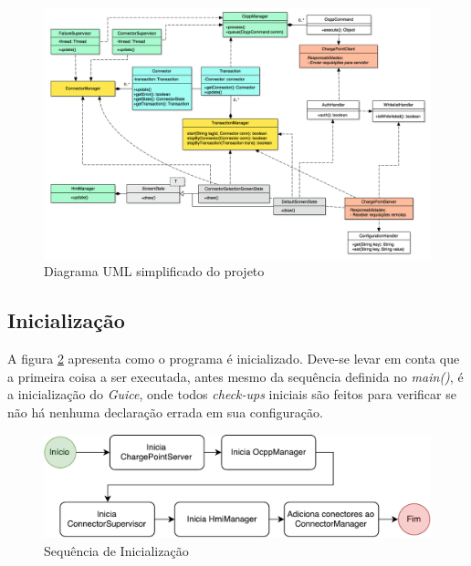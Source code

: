         \begin{figure}[H]
          \begin{center}
            \includegraphics[width=\textwidth,natwidth=400,natheight=288]{assets/images/uml.jpg}
            \caption{Diagrama UML simplificado do projeto}
            \label{fig:uml}
          \end{center}
        \end{figure}

    \subsection{Inicialização}

      A figura \ref{fig:sw-init} apresenta como o programa é inicializado. Deve-se levar em conta que a primeira coisa a ser executada, antes mesmo da sequência definida no \textit{main()}, é a inicialização do \textit{Guice}, onde todos \textit{check-ups} iniciais são feitos para verificar se não há nenhuma declaração errada em sua configuração.

      \begin{figure}[H]
        \begin{center}
          \includegraphics[width=\textwidth]{assets/pdfs/sw-init.pdf}
          \caption{Sequência de Inicialização}
          \label{fig:sw-init}
        \end{center}
      \end{figure}

